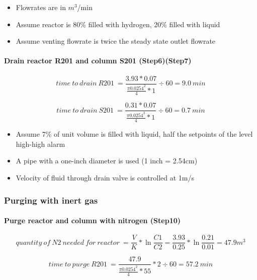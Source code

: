     \begin{itemize}
        \item Flowrates are in $m^3$/min
        \item Assume reactor is 80\% filled with hydrogen, 20\% filled with liquid
        \item Assume venting flowrate is twice the steady state outlet flowrate
    \end{itemize}
    
\paragraph{Drain reactor R201 and column S201 (Step6)(Step7)}   

    \begin{equation}
        time\:to\:drain\:R201\:=\frac{3.93 * 0.07}{\frac{\pi 0.0254^2}{4} * 1} \div 60 =9.0\:min
    \end{equation}
    
    \begin{equation}
        time\:to\:drain\:S201\:=\frac{0.31 * 0.07}{\frac{\pi 0.0254^2}{4} * 1} \div 60 =0.7\:min
    \end{equation}
    
    \begin{itemize}
        \item Assume 7\% of unit volume is filled with liquid, half the setpoints of the level high-high alarm
        \item A pipe with a one-inch diameter is used (1 inch = 2.54cm)
        \item Velocity of fluid through drain valve is controlled at 1m/s
    \end{itemize}

\subsubsection{Purging with inert gas} 
\paragraph{Purge reactor and column with nitrogen (Step10)}

    \begin{equation}
        quantity\:of\:N2\:needed\:for\:reactor\:=\frac{V}{K} * \ln \frac{C1}{C2} = \frac{3.93}{0.25} * \ln \frac{0.21}{0.01} = 47.9 m^3
    \end{equation}
    
    \begin{equation}
        time\:to\:purge\:R201\:=\frac{47.9}{\frac{\pi 0.0254^2}{4} * 55} * 2 \div 60 = 57.2\:min
    \end{equation}
    

